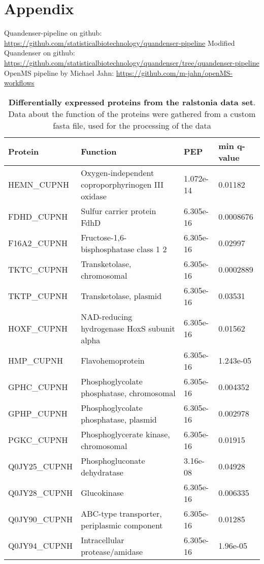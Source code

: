 \section{Appendix}

Quandenser-pipeline on github: \url{https://github.com/statisticalbiotechnology/quandenser-pipeline}
Modified Quandenser on github: \url{https://github.com/statisticalbiotechnology/quandenser/tree/quandenser-pipeline}
OpenMS pipeline by Michael Jahn: \url{https://github.com/m-jahn/openMS-workflows}


\begin{center}
\begin{longtable}{ l l l l }
\caption{\textbf{Differentially expressed proteins from the ralstonia data set}. Data about the function of the proteins were gathered from a custom fasta file, used for the processing of the data}\\
\toprule
Protein & Function & PEP & min q-value \\\midrule
HEMN\_CUPNH & Oxygen-independent coproporphyrinogen III oxidase& 1.072e-14 & 0.01182 \\ [0.5ex]
FDHD\_CUPNH & Sulfur carrier protein FdhD& 6.305e-16 & 0.0008676 \\ [0.5ex]
F16A2\_CUPNH & Fructose-1,6-bisphosphatase class 1 2& 6.305e-16 & 0.02997 \\ [0.5ex]
TKTC\_CUPNH & Transketolase, chromosomal& 6.305e-16 & 0.0002889 \\ [0.5ex]
TKTP\_CUPNH & Transketolase, plasmid& 6.305e-16 & 0.03531 \\ [0.5ex]
HOXF\_CUPNH & NAD-reducing hydrogenase HoxS subunit alpha& 6.305e-16 & 0.01562 \\ [0.5ex]
HMP\_CUPNH & Flavohemoprotein& 6.305e-16 & 1.243e-05 \\ [0.5ex]
GPHC\_CUPNH & Phosphoglycolate phosphatase, chromosomal& 6.305e-16 & 0.004352 \\ [0.5ex]
GPHP\_CUPNH & Phosphoglycolate phosphatase, plasmid& 6.305e-16 & 0.002978 \\ [0.5ex]
PGKC\_CUPNH & Phosphoglycerate kinase, chromosomal& 6.305e-16 & 0.01915 \\ [0.5ex]
Q0JY25\_CUPNH & Phosphogluconate dehydratase& 3.16e-08 & 0.04928 \\ [0.5ex]
Q0JY28\_CUPNH & Glucokinase& 6.305e-16 & 0.006335 \\ [0.5ex]
Q0JY90\_CUPNH & ABC-type transporter, periplasmic component& 6.305e-16 & 0.01285 \\ [0.5ex]
Q0JY94\_CUPNH & Intracellular protease/amidase& 6.305e-16 & 1.96e-05 \\ [0.5ex]

\end{longtable}
\end{center}

